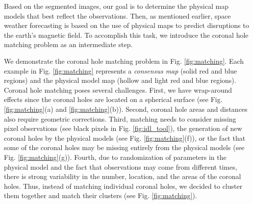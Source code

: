 \documentclass[journal]{IEEEtran}
\begin{document}
Based on the segmented images, our goal is to determine 
      the physical map models that best reflect the observations.
\color{black}
Then, as mentioned earlier,
      space weather forecasting is based on the use of physical maps
      to predict disruptions to the earth's magnetic field.
To accomplish this task, we introduce the coronal hole matching problem
     as an intermediate step.

We demonstrate the coronal hole matching problem in Fig. \ref{fig:matching}.
Each example in Fig. \ref{fig:matching} represents
     a \textit{consensus map} (solid red and blue regions)
     and the physical model map (hollow and light red and blue regions).              
Coronal hole matching poses several challenges.
First, we have wrap-around effects since the coronal holes
    are located on a spherical surface
    (see Fig. \ref{fig:matching}(a) and \ref{fig:matching}(b)).
Second, coronal hole areas and distances also require geometric corrections.
Third, matching needs to consider missing pixel observations
    (see black pixels in Fig. \ref{fig:idl_tool}),
    the generation of new coronal holes by the physical models
    (see Fig. \ref{fig:matching}(f)),
    or the fact that some of the coronal holes may be missing entirely from
    the physical models (see Fig. \ref{fig:matching}(g)).
Fourth, due to randomization of parameters in the physical model
    and the fact that observations may come from different times,
    there is strong variability in the number, location, and
    the areas of the coronal holes.    
Thus, instead of matching individual coronal holes,
    we decided to cluster them together and
    match their clusters (see Fig. \ref{fig:matching}).        
\end{document}
